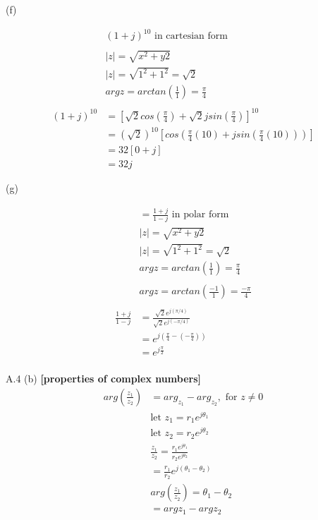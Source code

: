 \documentclass{article}
\begin{document}
(f)

\begin{equation*}
\begin{split}
    & (1+j)^{10} \text{ in cartesian form}\\\\
    & |z| = \sqrt{x^2+y2}\\ 
    & |z| = \sqrt{1^2 + 1^2} = \sqrt{2}\\
    & argz = arctan(\frac{1}{1}) = \frac{\pi}{4}\\\\
    (1+j)^{10} &= [\sqrt{2}cos(\frac{\pi}{4}) + \sqrt{2}jsin(\frac{\pi}{4})]^{10}\\
    &= (\sqrt{2})^{10}[cos(\frac{\pi}{4}(10) + jsin(\frac{\pi}{4}(10)))]\\
    &= 32[0+j]\\
    &= 32j
\end{split}
\end{equation*} 

(g)

\begin{equation*}
\begin{split}
    &= \frac{1+j}{1-j} \text{ in polar form}\\
    & |z| = \sqrt{x^2+y2}\\ 
    & |z| = \sqrt{1^2 + 1^2} = \sqrt{2}\\
    & argz = arctan(\frac{1}{1}) = \frac{\pi}{4}\\\\
    & argz = arctan(\frac{-1}{1}) = \frac{-\pi}{4}\\\\
    \frac{1+j}{1-j} &= \frac{\sqrt{2}e^{j(\pi/4)}}{\sqrt{2}e^{j(-\pi/4)}}\\
    &= e^{j(\frac{\pi}{4}-(-\frac{\pi}{4}))} \\
    &= e^{j\frac{\pi}{2}}\\
\end{split}
\end{equation*} 

A.4 (b) {\bf [properties of complex numbers]}\\

\begin{equation*}
\begin{split}
   arg(\frac{z_1}{z_2}) &= arg_{z_1} - arg_{z_2}, \text{ for } z \neq 0\\
   & \text{let } z_1 = r_1e^{j\theta_1}\\
   & \text{let } z_2 = r_2e^{j\theta_2}\\
   & \frac{z_1}{z_2} = \frac{r_1e^{j\theta_1}}{r_2e^{j\theta_2}}\\
   &= \frac{r_1}{r_2}e^{j(\theta_1-\theta_2)}\\
   & arg(\frac{z_1}{z_2}) = \theta_1 - \theta_2\\
   &= argz_1-argz_2\\
\end{split}
\end{equation*} 
\end{document}
